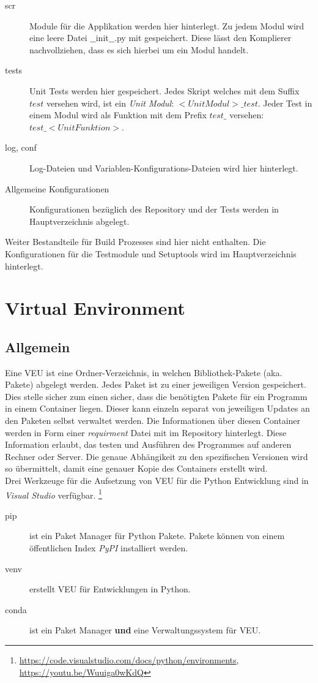 \begin{description}
	\item[scr] Module für die Applikation werden hier hinterlegt. Zu jedem Modul wird eine leere Datei $\_\_$init$\_\_$.py mit gespeichert. Diese lässt den Komplierer nachvollziehen, dass es sich hierbei um ein Modul handelt.	
	\item[tests] Unit Tests werden hier gespeichert. Jedes Skript welches mit dem Suffix $test$ versehen wird, ist ein \textit{Unit Modul}: $<Unit Modul>\_test$. Jeder Test in einem Modul wird als Funktion mit dem Prefix $test\_$ versehen: $test\_<Unit Funktion>$.
	\item[log, conf] Log-Dateien und Variablen-Konfigurations-Dateien wird hier hinterlegt.
	\item[Allgemeine Konfigurationen] Konfigurationen bezüglich des Repository und der Tests werden in Hauptverzeichnis abgelegt.
\end{description}
Weiter Bestandteile für Build Prozesses sind hier nicht enthalten. Die Konfigurationen für die Testmodule und Setuptools wird im Hauptverzeichnis hinterlegt.

\section{Virtual Environment}
\subsection{Allgemein}
Eine \gls{VEU} ist eine Ordner-Verzeichnis, in welchen Bibliothek-Pakete (aka. Pakete) abgelegt werden. Jedes Paket ist zu einer jeweiligen Version gespeichert. Dies stelle sicher zum einen sicher, dass die benötigten Pakete für ein Programm in einem Container liegen. Dieser kann einzeln separat von jeweiligen Updates an den Paketen selbst verwaltet werden. Die Informationen über diesen Container werden in Form einer \textit{requirment} Datei mit im Repository hinterlegt. Diese Information erlaubt, das testen und Ausführen des Programmes auf anderen Rechner oder Server. Die genaue Abhängikeit zu den spezifischen Versionen wird so übermittelt, damit eine genauer Kopie des Containers erstellt wird.\\

Drei Werkzeuge für die Aufsetzung von \gls{VEU} für die Python Entwicklung sind in \textit{Visual Studio} verfügbar. \footnote{
	\href{Quelle}{https://code.visualstudio.com/docs/python/environments},
	\href{Conda VE in VStudio}{https://youtu.be/Wuuiga0wKdQ}
}
\begin{description}
	\item[pip] ist ein Paket Manager für Python Pakete. Pakete können von einem öffentlichen Index \textit{PyPI} installiert werden.
	\item[venv] erstellt \gls{VEU} für Entwicklungen in Python.
	\item[conda] ist ein Paket Manager \textbf{und} eine Verwaltungssystem für \gls{VEU}. 
\end{description}

